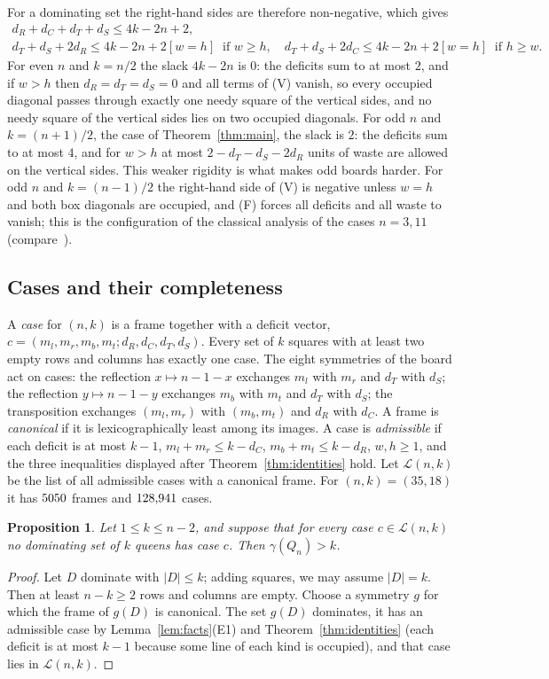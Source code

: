 \documentclass[11pt]{article}
\newtheorem{proposition}[theorem]{Proposition}
\theoremstyle{definition}
\theoremstyle{remark}
\newcommand{\dR}{d_R}
\newcommand{\dC}{d_C}
\newcommand{\dT}{d_T}
\newcommand{\dS}{d_S}
\begin{document}
For a dominating set the right-hand sides are therefore non-negative, which gives
\begin{gather*}
  \dR+\dC+\dT+\dS\le4k-2n+2,\\
  \dT+\dS+2\dR\le4k-2n+2[w=h]\ \text{ if } w\ge h,\quad
  \dT+\dS+2\dC\le4k-2n+2[w=h]\ \text{ if } h\ge w.
\end{gather*}
For even $n$ and $k=n/2$ the slack $4k-2n$ is $0$: the deficits sum to at most $2$, and if $w>h$ then
$\dR=\dT=\dS=0$ and all terms of (V) vanish, so every occupied diagonal passes through exactly one needy
square of the vertical sides, and no needy square of the vertical sides lies on two occupied diagonals.
For odd $n$ and $k=(n+1)/2$, the case of Theorem~\ref{thm:main}, the slack is $2$: the deficits sum to at
most $4$, and for $w>h$ at most $2-\dT-\dS-2\dR$ units of waste are allowed on the vertical sides. This
weaker rigidity is what makes odd boards harder. For odd $n$ and $k=(n-1)/2$ the right-hand side of (V)
is negative unless $w=h$ and both box diagonals are occupied, and (F) forces all deficits and all waste
to vanish; this is the configuration of the classical analysis of the cases $n=3,11$ (compare~\cite[Theorem~5.5]{KD}).

\subsection{Cases and their completeness}

A \emph{case} for $(n,k)$ is a frame together with a deficit vector,
$c=(m_l,m_r,m_b,m_t;\dR,\dC,\dT,\dS)$. Every set of $k$ squares with at least two empty rows and columns
has exactly one case. The eight symmetries of the board act on cases: the reflection $x\mapsto n-1-x$
exchanges $m_l$ with $m_r$ and $\dT$ with $\dS$; the reflection $y\mapsto n-1-y$ exchanges $m_b$ with
$m_t$ and $\dT$ with $\dS$; the transposition exchanges $(m_l,m_r)$ with $(m_b,m_t)$ and $\dR$ with
$\dC$. A frame is \emph{canonical} if it is lexicographically least among its images. A case is
\emph{admissible} if each deficit is at most $k-1$, $m_l+m_r\le k-\dC$, $m_b+m_t\le k-\dR$, $w,h\ge1$, and
the three inequalities displayed after Theorem~\ref{thm:identities} hold. Let $\mathcal L(n,k)$ be the
list of all admissible cases with a canonical frame. For $(n,k)=(35,18)$ it has $5050$ frames
and $128{,}941$ cases.

\begin{proposition}\label{prop:cover}
Let $1\le k\le n-2$, and suppose that for every case $c\in\mathcal L(n,k)$ no dominating set of $k$
queens has case $c$. Then $\gamma(Q_n)>k$.
\end{proposition}
\begin{proof}
Let $D$ dominate with $|D|\le k$; adding squares, we may assume $|D|=k$. Then at least $n-k\ge2$ rows and
columns are empty. Choose a symmetry $g$ for which the frame of $g(D)$ is canonical. The set $g(D)$
dominates, it has an admissible case by Lemma~\ref{lem:facts}(E1) and Theorem~\ref{thm:identities}
(each deficit is at most $k-1$ because some line of each kind is occupied), and that case lies in
$\mathcal L(n,k)$.
\end{proof}
\end{document}
